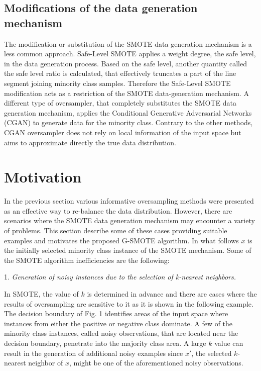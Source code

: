\documentclass[parskip=full]{scrartcl}
\begin{document}
\subsection{Modifications of the data generation mechanism}

The modification or substitution of the SMOTE data generation mechanism is a
less common approach. Safe-Level SMOTE \cite{Bunkhumpornpat2009} applies a
weight degree, the safe level, in the data generation process. Based on the safe
level, another quantity called the safe level ratio is calculated, that
effectively truncates a part of the line segment joining minority class samples.
Therefore the Safe-Level SMOTE modification acts as a restriction of the SMOTE
data-generation mechanism. A different type of oversampler, that completely
substitutes the SMOTE data generation mechanism, applies the Conditional
Generative Adversarial Networks (CGAN) \cite{Douzas2017b} to generate data for
the minority class. Contrary to the other methods, CGAN oversampler does not
rely on local information of the input space but aims to approximate directly
the true data distribution.

\section{Motivation}
In the previous section various informative oversampling methods were presented
as an effective way to re-balance the data distribution. However, there are
scenarios where the SMOTE data generation mechanism may encounter a variety of
problems. This section describe some of these cases providing suitable examples
and motivates the proposed G-SMOTE algorithm. In what follows \( x \) is the
initially selected minority class instance of the SMOTE mechanism.  Some of the
SMOTE algorithm inefficiencies are the following:

1. \textit{Generation of noisy instances due to the selection of k-nearest
neighbors.}

In SMOTE, the value of \( k \) is determined in advance and there are cases
where the results of oversampling are sensitive to it as it is shown in the
following example. The decision boundary of Fig. 1 identifies areas of the input
space where instances from either the positive or negative class dominate. A few
of the minority class instances, called noisy observations, that are located
near the decision boundary, penetrate into the majority class area. A large  \(k
\) value can result in the generation of additional noisy examples since \(x'
\), the selected \( k \)-nearest neighbor of \( x \), might be one of the
aforementioned noisy observations.
\end{document}
